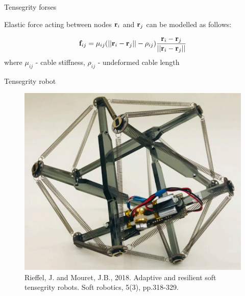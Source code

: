 \documentclass{beamer}
\begin{document}
\begin{frame}{Tensegrity forses}
	\begin{flushleft}
		
		Elastic force acting between nodes $\mathbf{r}_i$ and $\mathbf{r}_j$ can be modelled as follows:
		
		\begin{equation}
			\label{eq:elastice_force_vanilla}
			\mathbf{f}_{ij} = \mu_{ij} (||\mathbf{r}_i - \mathbf{r}_j|| - \rho_{ij}) \frac{\mathbf{r}_i - \mathbf{r}_j}{||\mathbf{r}_i - \mathbf{r}_j||}
		\end{equation}
		where $\mu_{ij}$ - cable stiffness, $ \rho_{ij}$ - undeformed cable length
	
		
	\end{flushleft}
\end{frame}




\begin{frame}{Tensegrity robot}
	\begin{flushleft}
		
		\begin{figure}
			\centering
			\includegraphics[width=0.7\linewidth]{tensegrity_2}
			\caption{		Rieffel, J. and Mouret, J.B., 2018. Adaptive and resilient soft tensegrity robots. Soft robotics, 5(3), pp.318-329.}
			\label{fig:tensegrity1}
		\end{figure}
		

	\end{flushleft}
\end{frame}

\myqrframe
\end{document}
